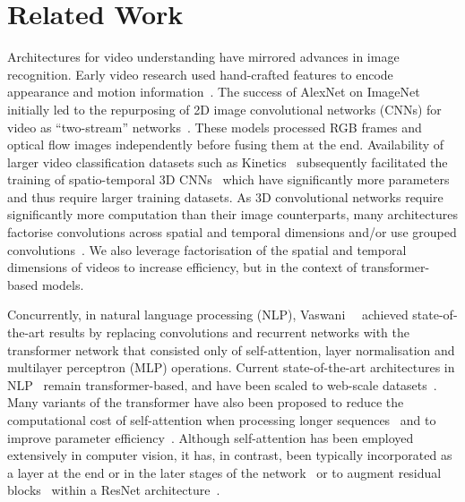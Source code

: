 \section{Related Work}

Architectures for video understanding have mirrored advances in image recognition.
Early video research used hand-crafted features to encode appearance and motion information~\cite{laptev_ijcv_2005, wang_ijcv_2013}.
The success of AlexNet on ImageNet~\cite{krizhevsky_neurips_2012, deng_cvpr_2009} initially led to the repurposing of 2D image convolutional networks (CNNs) for video as ``two-stream'' networks~\cite{karpathy_cvpr_2014, simonyan_neurips_2014, ng_cvpr_2015}.
These models processed RGB frames and optical flow images independently before fusing them at the end.
Availability of larger video classification datasets such as Kinetics~\cite{kay_arxiv_2017} subsequently facilitated the training of spatio-temporal 3D CNNs~\cite{carreira_cvpr_2017, feichtenhofer_neurips_2016,tran_iccv_2015} which have significantly more parameters and thus require larger training datasets.
As 3D convolutional networks require significantly more computation than their image counterparts, many architectures factorise convolutions across spatial and temporal dimensions and/or use grouped convolutions~\cite{sun_iccv_2015,tran_iccv_2019,tran_cvpr_2018,xie_s3d_eccv_2018, feichtenhofer_cvpr_2020}.
We also leverage factorisation of the spatial and temporal dimensions of videos to increase efficiency, but in the context of transformer-based models.

Concurrently, in natural language processing (NLP), Vaswani~\etal~\cite{vaswani_neurips_2017} achieved state-of-the-art results by replacing convolutions and recurrent networks with the transformer network that consisted only of self-attention, layer normalisation and multilayer perceptron (MLP) operations.
Current state-of-the-art architectures in NLP~\cite{devlin_naacl_2019, raffel_jmlr_2020} remain transformer-based, and have been scaled to web-scale datasets~\cite{brown_gpt3_neurips_2020}.
Many variants of the transformer have also been proposed to reduce the computational cost of self-attention when processing longer sequences~\cite{child_arxiv_2019, choromanski_arxiv_2020,kitaev_iclr_2020, tay2020long, tay2020efficient, wang_arxiv_2020} and to improve parameter efficiency~\cite{lan2019albert, dehghani2018universal}.
Although self-attention has been employed extensively in computer vision, it has, in contrast, been typically incorporated as a layer at the end or in the later stages of the network~\cite{wang_cvpr_2018, carion_eccv_2020,  huang_ccnet_iccv_2019,wang_vistr_arxiv_2020, zhang_dgmn_cvpr_2020} or to augment residual blocks~\cite{hu_squeeze_excite_cvpr_2018, cao_gcnet_cvprw_2019, chen_danet_neurips_2018, srinivas_cvpr_2021} within a ResNet architecture~\cite{he_cvpr_2016}.


